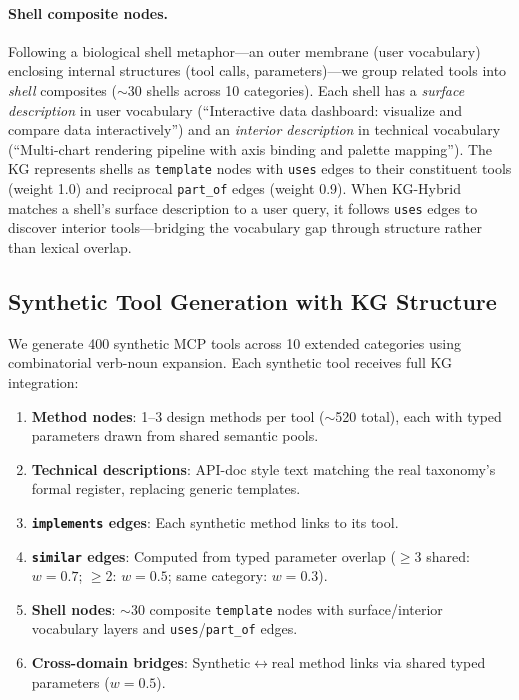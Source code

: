 \documentclass[11pt,a4paper]{article}
\begin{document}
\paragraph{Shell composite nodes.}
Following a biological shell metaphor---an outer membrane (user vocabulary) enclosing internal structures (tool calls, parameters)---we group related tools into \textit{shell} composites ($\sim$30 shells across 10 categories). Each shell has a \textit{surface description} in user vocabulary (``Interactive data dashboard: visualize and compare data interactively'') and an \textit{interior description} in technical vocabulary (``Multi-chart rendering pipeline with axis binding and palette mapping''). The KG represents shells as \texttt{template} nodes with \texttt{uses} edges to their constituent tools (weight 1.0) and reciprocal \texttt{part\_of} edges (weight 0.9). When KG-Hybrid matches a shell's surface description to a user query, it follows \texttt{uses} edges to discover interior tools---bridging the vocabulary gap through structure rather than lexical overlap.

\subsection{Synthetic Tool Generation with KG Structure}

We generate 400 synthetic MCP tools across 10 extended categories using combinatorial verb-noun expansion. Each synthetic tool receives full KG integration:

\begin{enumerate}
  \item \textbf{Method nodes}: 1--3 design methods per tool ($\sim$520 total), each with typed parameters drawn from shared semantic pools.
  \item \textbf{Technical descriptions}: API-doc style text matching the real taxonomy's formal register, replacing generic templates.
  \item \textbf{\texttt{implements} edges}: Each synthetic method links to its tool.
  \item \textbf{\texttt{similar} edges}: Computed from typed parameter overlap ($\geq$3 shared: $w=0.7$; $\geq$2: $w=0.5$; same category: $w=0.3$).
  \item \textbf{Shell nodes}: $\sim$30 composite \texttt{template} nodes with surface/interior vocabulary layers and \texttt{uses}/\texttt{part\_of} edges.
  \item \textbf{Cross-domain bridges}: Synthetic$\leftrightarrow$real method links via shared typed parameters ($w=0.5$).
\end{enumerate}
\end{document}
